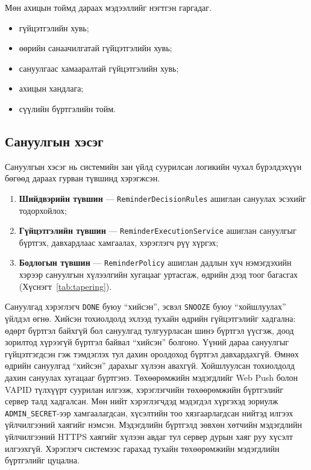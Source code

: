 Мөн ахицын тоймд дараах мэдээллийг нэгтгэн гаргадаг.

\begin{itemize}
    \item гүйцэтгэлийн хувь;
    \item өөрийн санаачилгатай гүйцэтгэлийн хувь;
    \item сануулгаас хамааралтай гүйцэтгэлийн хувь;
    \item ахицын хандлага;
    \item сүүлийн бүртгэлийн тойм.
\end{itemize}

\subsection{Сануулгын хэсэг}

Сануулгын хэсэг нь системийн зан үйлд суурилсан логикийн чухал бүрэлдэхүүн бөгөөд дараах гурван түвшинд хэрэгжсэн.

\begin{enumerate}
    \item \textbf{Шийдвэрийн түвшин} --- \texttt{ReminderDecisionRules} ашиглан сануулах эсэхийг тодорхойлох;
    \item \textbf{Гүйцэтгэлийн түвшин} --- \texttt{ReminderExecutionService} ашиглан сануулгыг бүртгэх, давхардлаас хамгаалах, хэрэглэгч рүү хүргэх;
    \item \textbf{Бодлогын түвшин} --- \texttt{ReminderPolicy} ашиглан дадлын хүч нэмэгдэхийн хэрээр сануулгын хүлээлгийн хугацааг уртасгаж, өдрийн дээд тоог багасгах (Хүснэгт~\ref{tab:tapering}).
\end{enumerate}

Сануулгад хэрэглэгч \texttt{DONE} буюу ``хийсэн'', эсвэл \texttt{SNOOZE} буюу ``хойшлуулах'' үйлдэл өгнө. Хийсэн тохиолдолд эхлээд тухайн өдрийн гүйцэтгэлийг хадгална: өдөрт бүртгэл байхгүй бол сануулгад тулгуурласан шинэ бүртгэл үүсгэж, доод зорилтод хүрээгүй бүртгэл байвал ``хийсэн'' болгоно. Үүний дараа сануулгыг гүйцэтгэгдсэн гэж тэмдэглэх тул дахин оролдоход бүртгэл давхардахгүй. Өмнөх өдрийн сануулгад ``хийсэн'' дарахыг хүлээн авахгүй. Хойшлуулсан тохиолдолд дахин сануулах хугацааг бүртгэнэ. Төхөөрөмжийн мэдэгдлийг Web Push болон VAPID түлхүүрт суурилан илгээж, хэрэглэгчийн төхөөрөмжийн бүртгэлийг сервер талд хадгалсан. Мөн нийт хэрэглэгчдэд мэдэгдэл хүргэхэд зориулж \texttt{ADMIN\_SECRET}-ээр хамгаалагдсан, хүсэлтийн тоо хязгаарлагдсан нийтэд илгээх үйлчилгээний хаягийг нэмсэн. Мэдэгдлийн бүртгэлд зөвхөн хөтчийн мэдэгдлийн үйлчилгээний HTTPS хаягийг хүлээн авдаг тул сервер дурын хаяг руу хүсэлт илгээхгүй. Хэрэглэгч системээс гарахад тухайн төхөөрөмжийн мэдэгдлийн бүртгэлийг цуцална.


